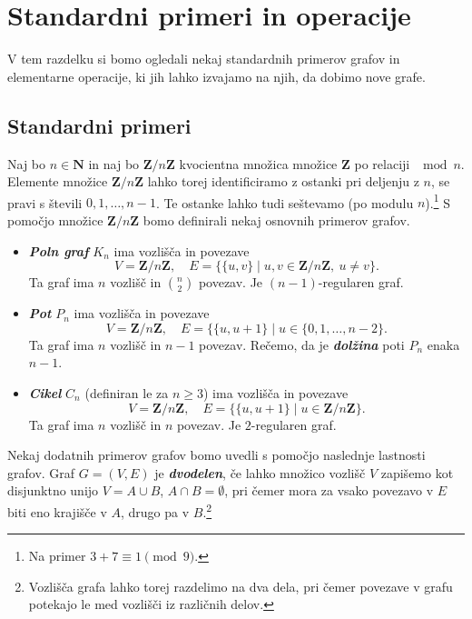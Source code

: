 \documentclass[11pt]{book}
\def\NN{\mathbf{N}}
\def\ZZ{\mathbf{Z}}
\def\definicija{\color{rdeca}\bf\em}
\theoremstyle{definition}
\theoremstyle{zgled}
\theoremstyle{odprtproblem}
\theoremstyle{domacanaloga}
\theoremstyle{izrek}
\begin{document}
\section{Standardni primeri in operacije}

V tem razdelku si bomo ogledali nekaj standardnih primerov grafov in elementarne operacije, ki jih lahko izvajamo na njih, da dobimo nove grafe.

\subsection{Standardni primeri}

Naj bo $n \in \NN$ in naj bo $\ZZ/n\ZZ$ kvocientna množica množice $\ZZ$ po relaciji $\mod{n}$. Elemente množice $\ZZ/n\ZZ$ lahko torej identificiramo z ostanki pri deljenju z $n$, se pravi s števili $0, 1, \dots, n-1$. Te ostanke lahko tudi seštevamo (po modulu $n$).\footnote{Na primer $3 + 7 \equiv 1 \pmod{9}$.} S pomočjo množice $\ZZ/n\ZZ$ bomo definirali nekaj osnovnih primerov grafov.

\begin{itemize}
    \item {\definicija Poln graf} $K_n$ ima vozlišča in povezave 
\[
    V = \ZZ/n\ZZ, \quad
    E = \{ \{ u,v \} \mid u,v \in \ZZ/n\ZZ, \ u \neq v \}.
\]
Ta graf ima $n$ vozlišč in $\binom{n}{2}$ povezav. Je $(n-1)$-regularen graf.

    \item {\definicija Pot} $P_n$ ima vozlišča in povezave
\[
    V = \ZZ/n\ZZ, \quad
    E = \{ \{ u, u+1 \} \mid u \in \{ 0, 1, \dots, n-2 \}.
\]
Ta graf ima $n$ vozlišč in $n-1$ povezav. Rečemo, da je {\definicija dolžina} poti $P_n$ enaka $n-1$.

    \item {\definicija Cikel} $C_n$ (definiran le za $n \geq 3$) ima vozlišča in povezave
\[
    V = \ZZ/n\ZZ, \quad
    E = \{ \{ u, u+1 \} \mid u \in \ZZ/n\ZZ \}.
\]
Ta graf ima $n$ vozlišč in $n$ povezav. Je $2$-regularen graf.
\end{itemize}

Nekaj dodatnih primerov grafov bomo uvedli s pomočjo naslednje lastnosti grafov. Graf $G = (V,E)$ je {\definicija dvodelen}, če lahko množico vozlišč $V$ zapišemo kot disjunktno unijo $V = A \cup B$, $A \cap B = \emptyset$, pri čemer mora za vsako povezavo v $E$ biti eno krajišče v $A$, drugo pa v $B$.\footnote{Vozlišča grafa lahko torej razdelimo na dva dela, pri čemer povezave v grafu potekajo le med vozlišči iz različnih delov.}
\end{document}

